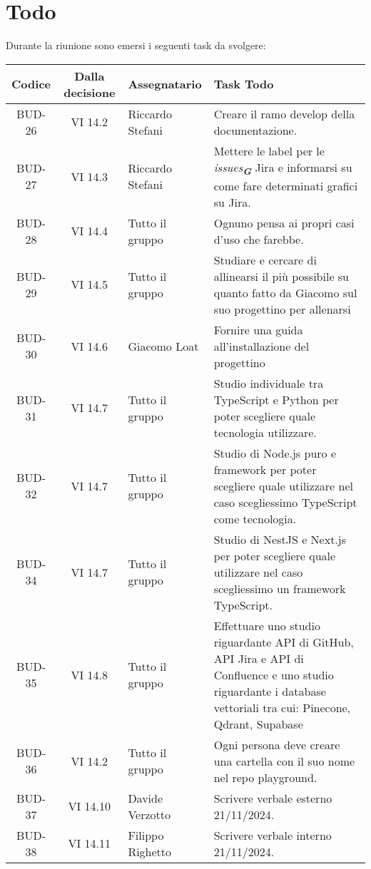 
\section{Todo}

Durante la riunione sono emersi i seguenti task da svolgere:

\vspace{0.5cm}

\begin{table}[htbp]
\centering
{}
\begin{tabular}{|c|c|p{}|p{}|}
    \hline
    \rowcolor[gray]{0.75}
    \textbf{Codice} & \textbf{Dalla decisione} & \textbf{Assegnatario} & \textbf{Task Todo} \\
    \hline
    BUD-26 & VI 14.2 & Riccardo Stefani & Creare il ramo develop della documentazione. \\
    \hline
    BUD-27 & VI 14.3 & Riccardo Stefani & Mettere le label per le \emph{issues}\textsubscript{\textbf{\textit{G}}} Jira e informarsi su come fare determinati grafici su Jira. \\
    \hline
    BUD-28 & VI 14.4 & Tutto il gruppo & Ognuno pensa ai propri casi d'uso che farebbe. \\
    \hline
    BUD-29 & VI 14.5 & Tutto il gruppo & Studiare e cercare di allinearsi il più possibile su quanto fatto da Giacomo sul suo progettino per allenarsi\\
    \hline
    BUD-30 & VI 14.6 & Giacomo Loat & Fornire una guida all'installazione del progettino\\
    \hline
    BUD-31 & VI 14.7 & Tutto il gruppo & Studio individuale tra TypeScript e Python per poter scegliere quale tecnologia utilizzare.\\
    \hline
    BUD-32 & VI 14.7 & Tutto il gruppo & Studio di Node.js puro e framework per poter scegliere quale utilizzare nel caso scegliessimo TypeScript come tecnologia.\\
    \hline
    BUD-34 & VI 14.7 & Tutto il gruppo & Studio di NestJS e Next.js per poter scegliere quale utilizzare nel caso scegliessimo un framework TypeScript.\\
    \hline
    BUD-35 & VI 14.8 & Tutto il gruppo & Effettuare uno studio riguardante API di GitHub, API Jira e API di Confluence e uno studio riguardante i database vettoriali tra cui: Pinecone, Qdrant, Supabase  \\
    \hline
    BUD-36 & VI 14.2 & Tutto il gruppo & Ogni persona deve creare una cartella con il suo nome nel repo playground. \\
    \hline
    BUD-37 & VI 14.10 & Davide Verzotto & Scrivere verbale esterno 21/11/2024. \\
    \hline
    BUD-38 & VI 14.11 & Filippo Righetto & Scrivere verbale interno 21/11/2024. \\
    \hline
\end{tabular}
\end{table}